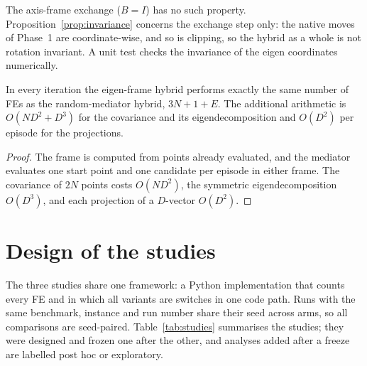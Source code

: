 \begin{remark}
The axis-frame exchange ($B=I$) has no such property. Proposition~\ref{prop:invariance} concerns the exchange step only:
the native moves of Phase~1 are coordinate-wise, and so is clipping, so the hybrid as a whole is not rotation invariant. A
unit test checks the invariance of the eigen coordinates numerically.
\end{remark}

\begin{proposition}
\label{prop:cost}
In every iteration the eigen-frame hybrid performs exactly the same number of FEs as the random-mediator hybrid, $3N+1+E$.
The additional arithmetic is $O(ND^2+D^3)$ for the covariance and its eigendecomposition and $O(D^2)$ per episode for the
projections.
\end{proposition}
\begin{proof}
The frame is computed from points already evaluated, and the mediator evaluates one start point and one candidate per
episode in either frame. The covariance of $2N$ points costs $O(ND^2)$, the symmetric eigendecomposition $O(D^3)$, and each
projection of a $D$-vector $O(D^2)$.
\end{proof}

\section{Design of the studies}
\label{sec:design}

The three studies share one framework: a Python implementation that counts every FE and in which all variants are switches
in one code path. Runs with the same benchmark, instance and run number share their seed across arms, so all comparisons are
seed-paired. Table~\ref{tab:studies} summarises the studies; they were designed and frozen one after the other, and
analyses added after a freeze are labelled post hoc or exploratory.

